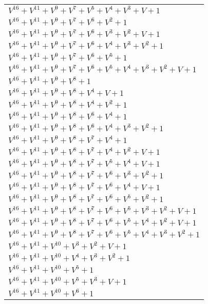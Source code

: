 \documentclass[12pt]{article}
\begin{document}
\begin{adjustwidth}{-4cm}{}
\begin{center}
\begin{longtable}{|l|}
$V^{16}  +V^{11}  +V^{9}  +V^{7}  +V^{5}  +V^{4}  +V^{3}  + V + 1$ \\
$V^{16}  +V^{11}  +V^{9}  +V^{7}  +V^{6}  +V^{2}  + 1$ \\
$V^{16}  +V^{11}  +V^{9}  +V^{7}  +V^{6}  +V^{3}  +V^{2}  + V + 1$ \\
$V^{16}  +V^{11}  +V^{9}  +V^{7}  +V^{6}  +V^{4}  +V^{3}  +V^{2}  + 1$ \\
$V^{16}  +V^{11}  +V^{9}  +V^{7}  +V^{6}  +V^{5}  + 1$ \\
$V^{16}  +V^{11}  +V^{9}  +V^{7}  +V^{6}  +V^{5}  +V^{4}  +V^{3}  +V^{2}  + V + 1$ \\
$V^{16}  +V^{11}  +V^{9}  +V^{8}  + 1$ \\
$V^{16}  +V^{11}  +V^{9}  +V^{8}  +V^{4}  + V + 1$ \\
$V^{16}  +V^{11}  +V^{9}  +V^{8}  +V^{4}  +V^{2}  + 1$ \\
$V^{16}  +V^{11}  +V^{9}  +V^{8}  +V^{6}  +V^{4}  + 1$ \\
$V^{16}  +V^{11}  +V^{9}  +V^{8}  +V^{6}  +V^{4}  +V^{3}  +V^{2}  + 1$ \\
$V^{16}  +V^{11}  +V^{9}  +V^{8}  +V^{7}  +V^{4}  + 1$ \\
$V^{16}  +V^{11}  +V^{9}  +V^{8}  +V^{7}  +V^{4}  +V^{2}  + V + 1$ \\
$V^{16}  +V^{11}  +V^{9}  +V^{8}  +V^{7}  +V^{5}  +V^{4}  + V + 1$ \\
$V^{16}  +V^{11}  +V^{9}  +V^{8}  +V^{7}  +V^{6}  +V^{3}  +V^{2}  + 1$ \\
$V^{16}  +V^{11}  +V^{9}  +V^{8}  +V^{7}  +V^{6}  +V^{4}  + V + 1$ \\
$V^{16}  +V^{11}  +V^{9}  +V^{8}  +V^{7}  +V^{6}  +V^{5}  +V^{2}  + 1$ \\
$V^{16}  +V^{11}  +V^{9}  +V^{8}  +V^{7}  +V^{6}  +V^{5}  +V^{3}  +V^{2}  + V + 1$ \\
$V^{16}  +V^{11}  +V^{9}  +V^{8}  +V^{7}  +V^{6}  +V^{5}  +V^{4}  +V^{2}  + V + 1$ \\
$V^{16}  +V^{11}  +V^{9}  +V^{8}  +V^{7}  +V^{6}  +V^{5}  +V^{4}  +V^{3}  +V^{2}  + 1$ \\
$V^{16}  +V^{11}  +V^{10}  +V^{3}  +V^{2}  + V + 1$ \\
$V^{16}  +V^{11}  +V^{10}  +V^{4}  +V^{3}  +V^{2}  + 1$ \\
$V^{16}  +V^{11}  +V^{10}  +V^{5}  + 1$ \\
$V^{16}  +V^{11}  +V^{10}  +V^{5}  +V^{3}  + V + 1$ \\
$V^{16}  +V^{11}  +V^{10}  +V^{6}  + 1$ \\

\end{longtable}
\end{center}
\end{adjustwidth}
\end{document}
